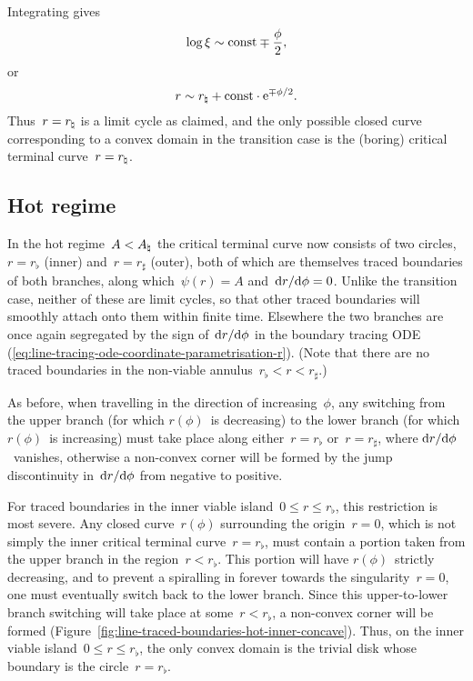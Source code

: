 Integrating gives
\begin{equation}
  \log \xi \sim \mathrm{const} \mp \frac{\phi}{2},
  \label{eq:line-traced-boundary-transition-log-xi-near-r-natural}
\end{equation}
or
\begin{equation}
  r \sim r_\natural + \mathrm{const} \cdot \mathrm{e}^{\mp \phi / 2}.
  \label{eq:line-traced-boundary-transition-r-near-r-natural}
\end{equation}
Thus~$r = r_\natural$ is a limit cycle as claimed,
and the only possible closed curve corresponding to a convex domain
in the transition case
is the (boring) critical terminal curve~$r = r_\natural$.

\subsection{Hot regime}
\label{sec:polar.tracing.hot}

In the hot regime~$A < A_\natural$
the critical terminal curve now consists of two circles,
$r = r_\flat$ (inner) and~$r = r_\sharp$ (outer),
both of which are themselves traced boundaries of both branches,
along which~$\psi (r) = A$ and~$\mathop{}\!\mathrm{d} r / {\mathop{}\!\mathrm{d}\phi} = 0$.
Unlike the transition case,
neither of these are limit cycles,
so that other traced boundaries will smoothly attach onto them
within finite time.
Elsewhere the two branches are once again segregated
by the sign of~$\mathop{}\!\mathrm{d} r / {\mathop{}\!\mathrm{d}\phi}$ in the boundary tracing ODE~%
  (\ref{eq:line-tracing-ode-coordinate-parametrisation-r}).
(Note that there are no traced boundaries
in the non-viable annulus~$r_\flat < r < r_\sharp$.)

As before, when travelling in the direction of increasing~$\phi$,
any switching from the upper branch (for which $r (\phi)$~is decreasing)
to the lower branch (for which $r (\phi)$~is increasing)
must take place along either~$r = r_\flat$ or~$r = r_\sharp$,
where $\mathop{}\!\mathrm{d} r / {\mathop{}\!\mathrm{d}\phi}$~vanishes,
otherwise a non-convex corner will be formed
by the jump discontinuity in~$\mathop{}\!\mathrm{d} r / {\mathop{}\!\mathrm{d}\phi}$
from negative to positive.

\begin{figure}
\end{figure}

For traced boundaries in the inner viable island~$0 \le r \le r_\flat$,
this restriction is most severe.
Any closed curve~$r (\phi)$ surrounding the origin~$r = 0$,
which is not simply the inner critical terminal curve~$r = r_\flat$,
must contain a portion taken from the upper branch
in the region~$r < r_\flat$.
This portion will have $r (\phi)$~strictly decreasing,
and to prevent a spiralling in forever
towards the singularity~$r = 0$,
one must eventually switch back to the lower branch.
Since this upper-to-lower branch switching
will take place at some~$r < r_\flat$,
a non-convex corner will be formed
(Figure~\ref{fig:line-traced-boundaries-hot-inner-concave}).
Thus, on the inner viable island~$0 \le r \le r_\flat$,
the only convex domain is the trivial disk
whose boundary is the circle~$r = r_\flat$.

